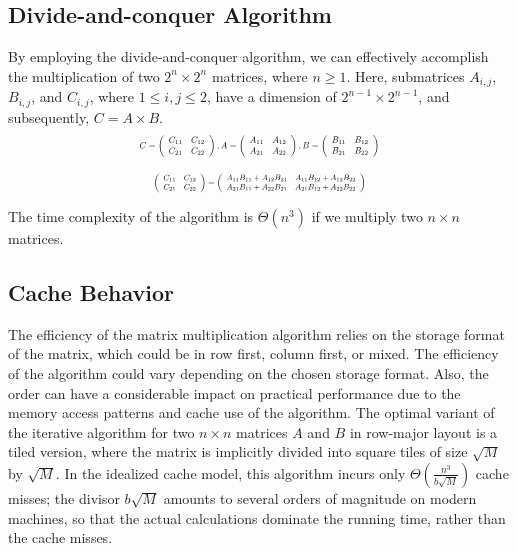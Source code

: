 \documentclass[conference]{IEEEtran}
\begin{document}
	\subsection{Divide-and-conquer Algorithm}
	By employing the divide-and-conquer algorithm, we can effectively accomplish the multiplication of two $2^n \times 2 ^ n$ matrices, where $n \geq 1$. Here, submatrices $A_{i,j}$, $B_{i,j}$, and $C_{i,j}$, where $1 \leq i,j \leq 2$, have a dimension of $2^{n - 1} \times 2^{n - 1}$, and subsequently, $C = A \times B$. \cite{b1}
	\begin{equation}\nonumber
		\resizebox{0.5\textwidth}{!}{$C=\left(\begin{array}{ll}C_{11} & C_{12} \\ C_{21} & C_{22}\end{array}\right), A=\left(\begin{array}{ll}A_{11} & A_{12} \\ A_{21} & A_{22}\end{array}\right), B=\left(\begin{array}{ll}B_{11} & B_{12} \\ B_{21} & B_{22}\end{array}\right)$}
	\end{equation}

	
	\begin{equation}
		\resizebox{0.44\textwidth}{!}{$\left(\begin{array}{ll}C_{11} & C_{12} \\ C_{21} & C_{22}\end{array}\right)=\left(\begin{array}{ll}A_{11} B_{11}+A_{12} B_{21} & A_{11} B_{12}+A_{12} B_{22} \\ A_{21} B_{11}+A_{22} B_{21} & A_{21} B_{12}+A_{22} B_{22}\end{array}\right)$}
	\end{equation}

	
	The time complexity of the algorithm is $\Theta(n^3)$ if we multiply two $n \times n $ matrices.
	\subsection{Cache Behavior}
	The efficiency of the matrix multiplication algorithm relies on the storage format of the matrix, which could be in row first, column first, or mixed. The efficiency of the algorithm could vary depending on the chosen storage format. Also, the order can have a considerable impact on practical performance due to the memory access patterns and cache use of the algorithm.\cite{b2} The optimal variant of the iterative algorithm for two $n \times n$ matrices $A$ and $B$ in row-major layout is a tiled version, where the matrix is implicitly divided into square tiles of size $\sqrt{M}$ by $\sqrt{M}$. \cite{b3} In the idealized cache model, this algorithm incurs only $ \Theta(\frac{n^3}{b\sqrt{M}})$ cache misses; the divisor $b\sqrt{M}$ amounts to several orders of magnitude on modern machines, so that the actual calculations dominate the running time, rather than the cache misses.
\end{document}
